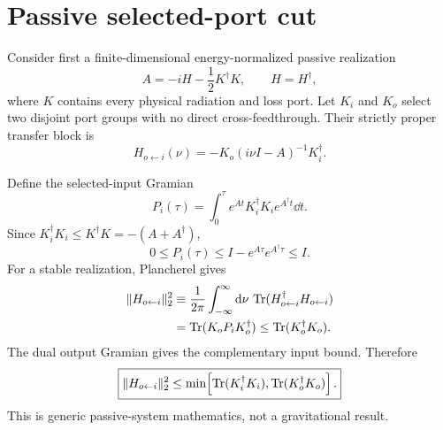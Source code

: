 \section{Passive selected-port cut}
\label{sec:passive}

Consider first a finite-dimensional energy-normalized passive realization
\begin{equation}
A=-iH-\frac12K^\dagger K,
\qquad H=H^\dagger,
\label{eq:Apassive}
\end{equation}
where $K$ contains every physical radiation and loss port. Let $K_i$ and $K_o$ select two disjoint port groups with no direct cross-feedthrough. Their strictly proper transfer block is
\begin{equation}
H_{o\leftarrow i}(\nu)
=-K_o(i\nu I-A)^{-1}K_i^\dagger .
\label{eq:crossH}
\end{equation}

Define the selected-input Gramian
\begin{equation}
P_i(\tau)=\int_0^\tau
 e^{At}K_i^\dagger K_i e^{A^\dagger t}\dd t .
\end{equation}
Since $K_i^\dagger K_i\le K^\dagger K=-(A+A^\dagger)$,
\begin{equation}
\boxed{
0\le P_i(\tau)
\le I-e^{A\tau}e^{A^\dagger\tau}
\le I .
}
\label{eq:PiBound}
\end{equation}
For a stable realization, Plancherel gives
\begin{align}
\|H_{o\leftarrow i}\|_2^2
&\equiv \frac{1}{2\pi}\int_{-\infty}^{\infty}\mathrm d\nu\,
\operatorname{Tr}(H_{o\leftarrow i}^\dagger H_{o\leftarrow i}) \\
&=\operatorname{Tr}(K_oP_iK_o^\dagger)
\le \operatorname{Tr}(K_o^\dagger K_o).
\end{align}
The dual output Gramian gives the complementary input bound. Therefore
\begin{equation}
\boxed{
\|H_{o\leftarrow i}\|_2^2
\le
\min\!\left[
\operatorname{Tr}(K_i^\dagger K_i),
\operatorname{Tr}(K_o^\dagger K_o)
\right].
}
\label{eq:h2cut}
\end{equation}
This is generic passive-system mathematics, not a gravitational result.

